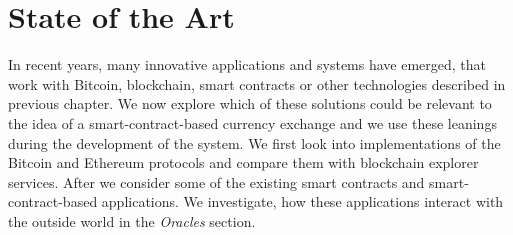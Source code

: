 \section{State of the Art}\label{sec:SOTA}
% 
In recent years, many innovative applications and systems have emerged, that work with Bitcoin, blockchain, smart contracts or other technologies described in previous chapter. We now explore which of these solutions could be relevant to the idea of a smart-contract-based currency exchange and we use these leanings during the development of the system. We first look into implementations of the Bitcoin and Ethereum protocols and compare them with blockchain explorer services. After we consider some of the existing smart contracts and smart-contract-based applications. We investigate, how these applications interact with the outside world in the \textit{Oracles} section. 


% 

% 

% 

% 